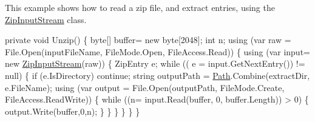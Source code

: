 This example shows how to read a zip file, and extract entries, using the {\ttfamily \mbox{\hyperlink{class_super_tiled2_unity_1_1_ionic_1_1_zip_1_1_zip_input_stream}{Zip\+Input\+Stream}}} class.


\begin{DoxyCode}
\textcolor{keyword}{private} \textcolor{keywordtype}{void} Unzip()
\{
    byte[] buffer= \textcolor{keyword}{new} byte[2048];
    \textcolor{keywordtype}{int} n;
    \textcolor{keyword}{using} (var raw = File.Open(inputFileName, FileMode.Open, FileAccess.Read))
    \{
        \textcolor{keyword}{using} (var input= \textcolor{keyword}{new} \mbox{\hyperlink{class_super_tiled2_unity_1_1_ionic_1_1_zip_1_1_zip_input_stream_af9203130f058abb23317725bcb98c047}{ZipInputStream}}(raw))
        \{
            ZipEntry e;
            \textcolor{keywordflow}{while} (( e = input.GetNextEntry()) != null)
            \{
                \textcolor{keywordflow}{if} (e.IsDirectory) \textcolor{keywordflow}{continue};
                \textcolor{keywordtype}{string} outputPath = \mbox{\hyperlink{namespace_path}{Path}}.Combine(extractDir, e.FileName);
                \textcolor{keyword}{using} (var output = File.Open(outputPath, FileMode.Create, FileAccess.ReadWrite))
                \{
                    \textcolor{keywordflow}{while} ((n= input.Read(buffer, 0, buffer.Length)) > 0)
                    \{
                        output.Write(buffer,0,n);
                    \}
                \}
            \}
        \}
    \}
\}
\end{DoxyCode}



